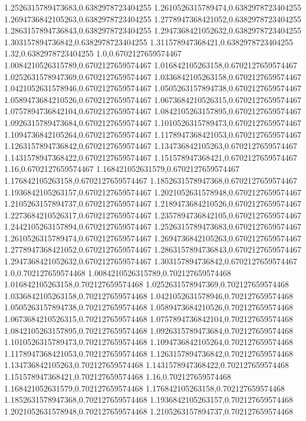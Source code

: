 1.2526315789473683,0.6382978723404255
1.2610526315789474,0.6382978723404255
1.2694736842105263,0.6382978723404255
1.2778947368421052,0.6382978723404255
1.2863157894736843,0.6382978723404255
1.2947368421052632,0.6382978723404255
1.303157894736842,0.6382978723404255
1.311578947368421,0.6382978723404255
1.32,0.6382978723404255
1.0,0.6702127659574467
1.0084210526315789,0.6702127659574467
1.016842105263158,0.6702127659574467
1.0252631578947369,0.6702127659574467
1.0336842105263158,0.6702127659574467
1.0421052631578946,0.6702127659574467
1.0505263157894738,0.6702127659574467
1.0589473684210526,0.6702127659574467
1.0673684210526315,0.6702127659574467
1.0757894736842104,0.6702127659574467
1.0842105263157895,0.6702127659574467
1.0926315789473684,0.6702127659574467
1.1010526315789473,0.6702127659574467
1.1094736842105264,0.6702127659574467
1.1178947368421053,0.6702127659574467
1.1263157894736842,0.6702127659574467
1.134736842105263,0.6702127659574467
1.1431578947368422,0.6702127659574467
1.151578947368421,0.6702127659574467
1.16,0.6702127659574467
1.168421052631579,0.6702127659574467
1.176842105263158,0.6702127659574467
1.1852631578947368,0.6702127659574467
1.1936842105263157,0.6702127659574467
1.2021052631578948,0.6702127659574467
1.2105263157894737,0.6702127659574467
1.2189473684210526,0.6702127659574467
1.2273684210526317,0.6702127659574467
1.2357894736842105,0.6702127659574467
1.2442105263157894,0.6702127659574467
1.2526315789473683,0.6702127659574467
1.2610526315789474,0.6702127659574467
1.2694736842105263,0.6702127659574467
1.2778947368421052,0.6702127659574467
1.2863157894736843,0.6702127659574467
1.2947368421052632,0.6702127659574467
1.303157894736842,0.6702127659574467
1.0,0.702127659574468
1.0084210526315789,0.702127659574468
1.016842105263158,0.702127659574468
1.0252631578947369,0.702127659574468
1.0336842105263158,0.702127659574468
1.0421052631578946,0.702127659574468
1.0505263157894738,0.702127659574468
1.0589473684210526,0.702127659574468
1.0673684210526315,0.702127659574468
1.0757894736842104,0.702127659574468
1.0842105263157895,0.702127659574468
1.0926315789473684,0.702127659574468
1.1010526315789473,0.702127659574468
1.1094736842105264,0.702127659574468
1.1178947368421053,0.702127659574468
1.1263157894736842,0.702127659574468
1.134736842105263,0.702127659574468
1.1431578947368422,0.702127659574468
1.151578947368421,0.702127659574468
1.16,0.702127659574468
1.168421052631579,0.702127659574468
1.176842105263158,0.702127659574468
1.1852631578947368,0.702127659574468
1.1936842105263157,0.702127659574468
1.2021052631578948,0.702127659574468
1.2105263157894737,0.702127659574468
